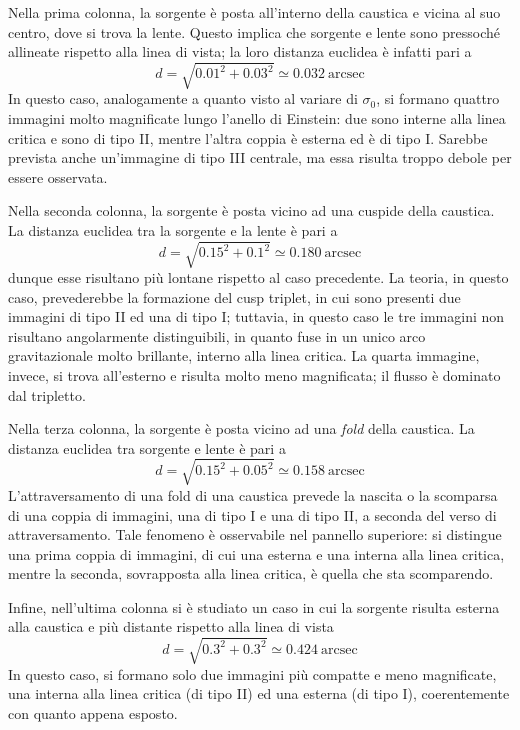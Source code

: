 Nella prima colonna, la sorgente è posta all'interno della caustica e vicina al suo centro, dove si trova la lente. Questo implica che sorgente e lente sono pressoché allineate rispetto alla linea di vista; la loro distanza euclidea è infatti pari a 
\begin{equation}
    d = \sqrt{0.01^2+0.03^2} \simeq 0.032\ \text{arcsec} 
\end{equation}
In questo caso, analogamente a quanto visto al variare di $\sigma_0$, si formano quattro immagini molto magnificate lungo l'anello di Einstein: due sono interne alla linea critica e sono di tipo II, mentre l'altra coppia è esterna ed è di tipo I. Sarebbe prevista anche un'immagine di tipo III centrale, ma essa risulta troppo debole per essere osservata. 

Nella seconda colonna, la sorgente è posta vicino ad una cuspide della caustica. La distanza euclidea tra la sorgente e la lente è pari a 
\begin{equation}
    d = \sqrt{0.15^2+0.1^2} \simeq 0.180\ \text{arcsec} 
\end{equation}
dunque esse risultano più lontane rispetto al caso precedente. La teoria, in questo caso, prevederebbe la formazione del cusp triplet, in cui sono presenti due immagini di tipo II ed una di tipo I; tuttavia, in questo caso le tre immagini non risultano angolarmente distinguibili, in quanto fuse in un unico arco gravitazionale molto brillante, interno alla linea critica. La quarta immagine, invece, si trova all'esterno e risulta molto meno magnificata; il flusso è  dominato dal tripletto.

Nella terza colonna, la sorgente è posta vicino ad una \emph{fold} della caustica. La distanza euclidea tra sorgente e lente è pari a 
\begin{equation}
    d = \sqrt{0.15^2+0.05^2} \simeq 0.158\ \text{arcsec} 
\end{equation}
L'attraversamento di una fold di una caustica prevede la nascita o la scomparsa di una coppia di immagini, una di tipo I e una di tipo II, a seconda del verso di attraversamento. Tale fenomeno è osservabile nel pannello superiore: si distingue una prima coppia di immagini, di cui una esterna e una interna alla linea critica, mentre la seconda, sovrapposta alla linea critica, è quella che sta scomparendo. 

Infine, nell'ultima colonna si è studiato un caso in cui la sorgente risulta esterna alla caustica e più distante rispetto alla linea di vista
\begin{equation}
    d = \sqrt{0.3^2+0.3^2} \simeq 0.424\ \text{arcsec} 
\end{equation}
In questo caso, si formano solo due immagini più compatte e meno magnificate, una interna alla linea critica (di tipo II) ed una esterna (di tipo I), coerentemente con quanto appena esposto. 

